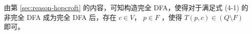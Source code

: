 
由第 \ref{sec:reason-hopcroft} 的内容，可知构造完全 DFA，使得对于满足式 (4-1) 的非完全 DFA 成为完全 DFA 后，存在 $ c \in V $， $ p \in F$ ，使得 $  T(p,c) \in (Q\setminus F) $ 即可。








